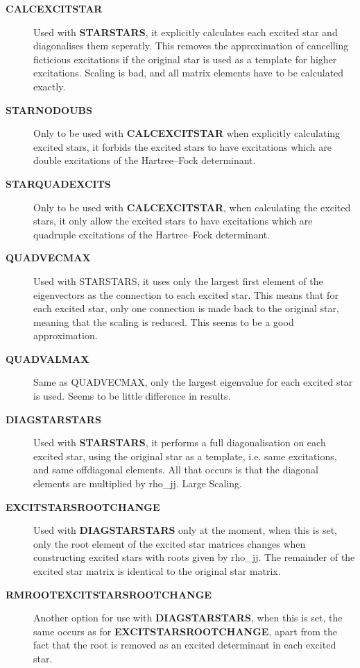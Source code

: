\documentclass[openany,a4paper,10pt,english]{manual}
\begin{document}
\begin{description}
\item[\textbf{CALCEXCITSTAR}] \leavevmode
Used with \textbf{STARSTARS}, it explicitly calculates each excited star
and diagonalises them seperatly. This removes the approximation of
cancelling ficticious excitations if the original star is used as
a template for higher excitations. Scaling is bad, and all matrix
elements have to be calculated exactly.

\item[\textbf{STARNODOUBS}] \leavevmode
Only to be used with \textbf{CALCEXCITSTAR} when explicitly calculating
excited stars, it forbids the excited stars to have excitations
which are double excitations of the Hartree--Fock determinant.

\item[\textbf{STARQUADEXCITS}] \leavevmode
Only to be used with \textbf{CALCEXCITSTAR}, when calculating the excited
stars, it only allow the excited stars to have excitations which
are quadruple excitations of the Hartree--Fock determinant.

\item[\textbf{QUADVECMAX}] \leavevmode
Used with STARSTARS, it uses only the largest first element of the
eigenvectors as the connection to each excited star. This means
that for each excited star, only one connection is made back to the
original star, meaning that the scaling is reduced. This seems to
be a good approximation.

\item[\textbf{QUADVALMAX}] \leavevmode
Same as QUADVECMAX, only the largest eigenvalue for each excited
star is used. Seems to be little difference in results.

\item[\textbf{DIAGSTARSTARS}] \leavevmode
Used with \textbf{STARSTARS}, it performs a full diagonalisation on
each excited star, using the original star as a template, i.e. same
excitations, and same offdiagonal elements. All that occurs is that
the diagonal elements are multiplied by rho\_jj. Large Scaling.

\item[\textbf{EXCITSTARSROOTCHANGE}] \leavevmode
Used with \textbf{DIAGSTARSTARS} only at the moment, when this is set,
only the root element of the excited star matrices changes when
constructing excited stars with roots given by rho\_jj. The remainder
of the excited star matrix is identical to the original star matrix.

\item[\textbf{RMROOTEXCITSTARSROOTCHANGE}] \leavevmode
Another option for use with \textbf{DIAGSTARSTARS}, when this is set, the
same occurs as for \textbf{EXCITSTARSROOTCHANGE}, apart from the fact that
the root is removed as an excited determinant in each excited star.

\end{description}
\end{document}
